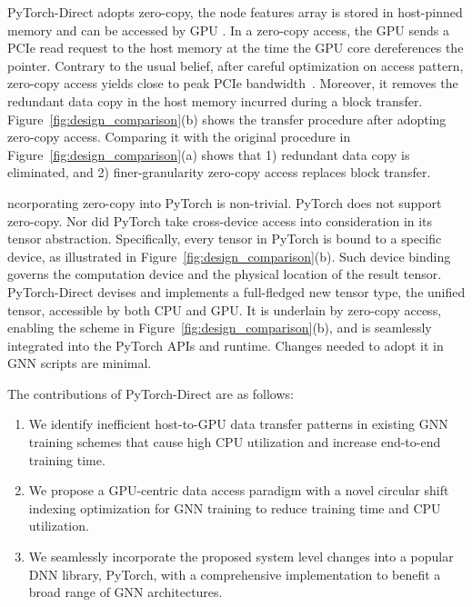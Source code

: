 PyTorch-Direct adopts zero-copy,  the node features array is stored in host-pinned memory and can be accessed by GPU .
In a zero-copy access, the GPU sends a PCIe read request to the host memory at the time the GPU core dereferences the pointer.
Contrary to the usual belief, after careful optimization on access pattern, zero-copy access yields close to peak PCIe bandwidth~\cite{minEMOGIEfficientMemoryaccess2020}.
Moreover, it removes the redundant data copy in the host memory incurred during a block transfer.
Figure~\ref{fig:design_comparison}(b) shows the transfer procedure after adopting zero-copy access.
Comparing it with the original procedure in Figure~\ref{fig:design_comparison}(a) shows that 1) redundant data copy is eliminated, and 2) finer-granularity zero-copy access replaces block transfer.

ncorporating zero-copy into PyTorch is non-trivial.
PyTorch does not support zero-copy.
Nor did PyTorch take cross-device access into consideration in its tensor abstraction.
Specifically, every tensor in PyTorch is bound to a specific device, as illustrated in Figure~\ref{fig:design_comparison}(b).
Such device binding governs the computation device and the physical location of the result tensor.
 PyTorch-Direct devises and implements a full-fledged new tensor type, the unified tensor, accessible by both CPU and GPU.
It is underlain by zero-copy access, enabling the scheme in Figure~\ref{fig:design_comparison}(b), and is seamlessly integrated into the PyTorch APIs and runtime.
Changes needed to adopt it in GNN scripts are minimal.

The contributions of PyTorch-Direct are as follows:

\begin{enumerate}
    \item We identify inefficient host-to-GPU data transfer patterns in existing GNN training schemes that cause high CPU utilization and increase end-to-end training time.
    \item We propose
          a GPU-centric data access paradigm with a novel circular shift indexing optimization for GNN training to reduce training time and CPU utilization.
    \item We seamlessly incorporate the proposed system level changes into a popular DNN library, PyTorch, with a comprehensive implementation to benefit a broad range of GNN architectures.
\end{enumerate}










